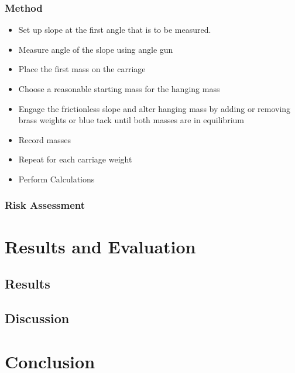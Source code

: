 \documentclass[11pt,a4paper]{article}
\begin{document}
\subsubsection{Method}
\begin{itemize}
	\item Set up slope at the first angle that is to be measured.
	\item Measure angle of the slope using angle gun
	\item Place the first mass on the carriage
	\item Choose a reasonable starting mass for the hanging mass
	\item Engage the frictionless slope and alter hanging mass by adding or removing brass weights or blue tack until both masses are in equilibrium
	\item Record masses
	\item Repeat for each carriage weight
	\item Perform Calculations
	
	 
\end{itemize}


\subsubsection{Risk Assessment}

\section{Results and Evaluation}
\subsection{Results}
\subsection{Discussion}


\section{Conclusion}

	
	
	
\end{document}
